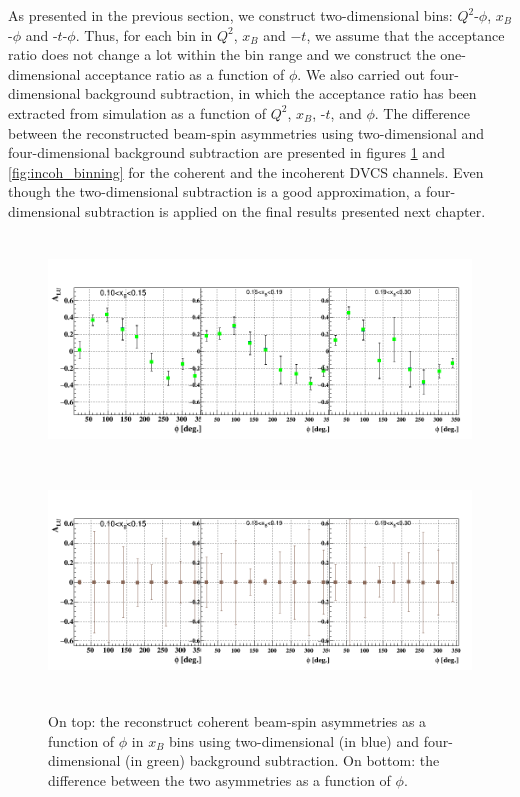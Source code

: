 As presented in the previous section, we construct two-dimensional bins: 
$Q^2$-$\phi$, $x_B$-$\phi$ and -$t$-$\phi$. Thus, for each bin in $Q^2$, $x_B$ 
and $-t$, we assume that the acceptance ratio does not change a lot within the 
bin range and we construct the one-dimensional acceptance ratio as a function 
of $\phi$. We also carried out four-dimensional background subtraction, in 
which the acceptance ratio has been extracted from simulation as a function of 
$Q^2$, $x_B$, -$t$, and $\phi$. The difference between the reconstructed 
beam-spin asymmetries using two-dimensional and four-dimensional background 
subtraction are presented in figures \ref{fig:coh_binning} and 
\ref{fig:incoh_binning} for the coherent and the incoherent DVCS channels.  
Even though the two-dimensional subtraction is a good approximation, a 
four-dimensional subtraction is applied on the final results presented next 
chapter. 

\begin{figure}[tbp]
   \centering
    \includegraphics[height=6.0cm]{fig_rtpc/updates/BSA_Coherent_xB.png}
    \includegraphics[height=6.0cm]{fig_rtpc/updates/diff_BSA_Coherent_xB_2.png}
    \caption{On top: the reconstruct coherent beam-spin asymmetries as a 
    function of $\phi$ in $x_{B}$ bins using two-dimensional (in blue) and 
 four-dimensional (in green) background subtraction.  On bottom: the difference 
 between the two asymmetries as a function of $\phi$.}
    \label{fig:coh_binning}
    \end{figure}            

